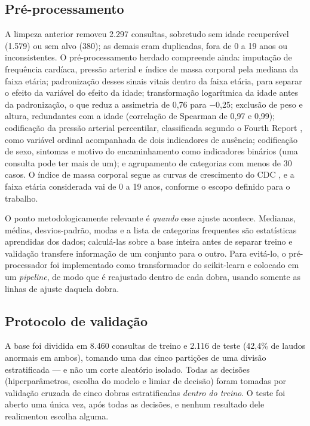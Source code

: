 \documentclass[conference]{IEEEtran}
\begin{document}
\subsection{Pré-processamento}
A limpeza anterior removeu 2.297 consultas, sobretudo sem idade recuperável (1.579) ou sem alvo (380); as demais eram duplicadas, fora de 0 a 19 anos ou inconsistentes. O pré-processamento herdado compreende ainda: imputação de frequência cardíaca, pressão arterial e índice de massa corporal pela mediana da faixa etária; padronização desses sinais vitais dentro da faixa etária, para separar o efeito da variável do efeito da idade; transformação logarítmica da idade antes da padronização, o que reduz a assimetria de 0,76 para $-$0,25; exclusão de peso e altura, redundantes com a idade (correlação de Spearman de 0,97 e 0,99); codificação da pressão arterial percentilar, classificada segundo o Fourth Report \cite{fourth}, como variável ordinal acompanhada de dois indicadores de ausência; codificação de sexo, sintomas e motivo do encaminhamento como indicadores binários (uma consulta pode ter mais de um); e agrupamento de categorias com menos de 30 casos. O índice de massa corporal segue as curvas de crescimento do CDC \cite{cdc}, e a faixa etária considerada vai de 0 a 19 anos, conforme o escopo definido para o trabalho.

O ponto metodologicamente relevante é \textit{quando} esse ajuste acontece. Medianas, médias, desvios-padrão, modas e a lista de categorias frequentes são estatísticas aprendidas dos dados; calculá-las sobre a base inteira antes de separar treino e validação transfere informação de um conjunto para o outro. Para evitá-lo, o pré-processador foi implementado como transformador do scikit-learn \cite{sklearn} e colocado em um \textit{pipeline}, de modo que é reajustado dentro de cada dobra, usando somente as linhas de ajuste daquela dobra.

\subsection{Protocolo de validação}
A base foi dividida em 8.460 consultas de treino e 2.116 de teste (42,4\% de laudos anormais em ambos), tomando uma das cinco partições de uma divisão estratificada --- e não um corte aleatório isolado. Todas as decisões (hiperparâmetros, escolha do modelo e limiar de decisão) foram tomadas por validação cruzada de cinco dobras estratificadas \textit{dentro do treino}. O teste foi aberto uma única vez, após todas as decisões, e nenhum resultado dele realimentou escolha alguma.
\end{document}

